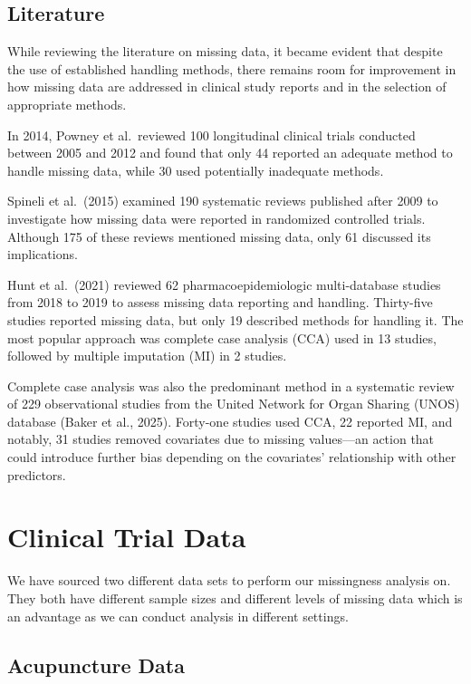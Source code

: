 \documentclass{article}
\begin{document}
\subsection{Literature}\label{literature}

While reviewing the literature on missing data, it became evident that
despite the use of established handling methods, there remains room for
improvement in how missing data are addressed in clinical study reports
and in the selection of appropriate methods.

In 2014, Powney et al.~reviewed 100 longitudinal clinical trials
conducted between 2005 and 2012 and found that only 44 reported an
adequate method to handle missing data, while 30 used potentially
inadequate methods.

Spineli et al.~(2015) examined 190 systematic reviews published after
2009 to investigate how missing data were reported in randomized
controlled trials. Although 175 of these reviews mentioned missing data,
only 61 discussed its implications.

Hunt et al.~(2021) reviewed 62 pharmacoepidemiologic multi-database
studies from 2018 to 2019 to assess missing data reporting and handling.
Thirty-five studies reported missing data, but only 19 described methods
for handling it. The most popular approach was complete case analysis
(CCA) used in 13 studies, followed by multiple imputation (MI) in 2
studies.

Complete case analysis was also the predominant method in a systematic
review of 229 observational studies from the United Network for Organ
Sharing (UNOS) database (Baker et al., 2025). Forty-one studies used
CCA, 22 reported MI, and notably, 31 studies removed covariates due to
missing values---an action that could introduce further bias depending
on the covariates' relationship with other predictors.

\newpage

\section{Clinical Trial Data}\label{clinical-trial-data}

We have sourced two different data sets to perform our missingness
analysis on. They both have different sample sizes and different levels
of missing data which is an advantage as we can conduct analysis in
different settings.

\subsection{Acupuncture Data}\label{acupuncture-data}
\end{document}
